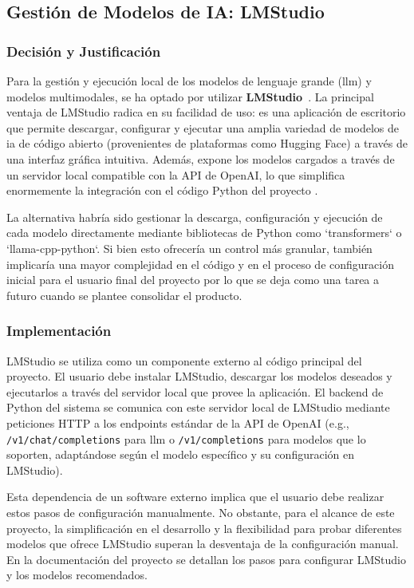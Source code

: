 \subsection{Gestión de Modelos de IA: LMStudio}
\label{subsec:decision_lmstudio}
\subsubsection{Decisión y Justificación}
Para la gestión y ejecución local de los modelos de lenguaje grande (\gls{llm}) y modelos multimodales, se ha optado por utilizar \textbf{LMStudio}~\cite{noauthor_lm_nodate}. La principal ventaja de LMStudio radica en su facilidad de uso: es una aplicación de escritorio que permite descargar, configurar y ejecutar una amplia variedad de modelos de \gls{ia} de código abierto (provenientes de plataformas como Hugging Face) a través de una interfaz gráfica intuitiva. Además, expone los modelos cargados a través de un servidor local compatible con la API de OpenAI, lo que simplifica enormemente la integración con el código Python del proyecto \cite{noauthor_lmstudio-python_nodate}.

La alternativa habría sido gestionar la descarga, configuración y ejecución de cada modelo directamente mediante bibliotecas de Python como `transformers` o `llama-cpp-python`. Si bien esto ofrecería un control más granular, también implicaría una mayor complejidad en el código y en el proceso de configuración inicial para el usuario final del proyecto por lo que se deja como una tarea a futuro cuando se plantee consolidar el producto.

\subsubsection{Implementación}
LMStudio se utiliza como un componente externo al código principal del proyecto. El usuario debe instalar LMStudio, descargar los modelos deseados y ejecutarlos a través del servidor local que provee la aplicación. El backend de Python del sistema se comunica con este servidor local de LMStudio mediante peticiones HTTP a los endpoints estándar de la API de OpenAI (e.g., \texttt{/v1/chat/completions} para \gls{llm} o \texttt{/v1/completions} para modelos que lo soporten, adaptándose según el modelo específico y su configuración en LMStudio).

Esta dependencia de un software externo implica que el usuario debe realizar estos pasos de configuración manualmente. No obstante, para el alcance de este proyecto, la simplificación en el desarrollo y la flexibilidad para probar diferentes modelos que ofrece LMStudio superan la desventaja de la configuración manual. En la documentación del proyecto se detallan los pasos para configurar LMStudio y los modelos recomendados.

